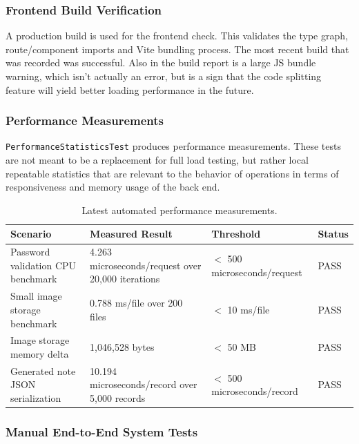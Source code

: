 \documentclass[a4paper, 12pt, titlepage]{article}
\begin{document}
\subsubsection{Frontend Build Verification}

A production build is used for the frontend check. This validates the type graph, route/component imports and Vite bundling process. The most recent build that was recorded was successful. Also in the build report is a large JS bundle warning, which isn't actually an error, but is a sign that the code splitting feature will yield better loading performance in the future.

\subsubsection{Performance Measurements}

\texttt{PerformanceStatisticsTest} produces performance measurements. These tests are not meant to be a replacement for full load testing, but rather local repeatable statistics that are relevant to the behavior of operations in terms of responsiveness and memory usage of the back end.

\begin{table}[H]
    \centering
    \begin{tabular}{|p{}|p{}|p{}|p{}|}
        \hline
        \textbf{Scenario} & \textbf{Measured Result} & \textbf{Threshold} & \textbf{Status} \\
        \hline
        Password validation CPU benchmark & 4.263 microseconds/request over 20,000 iterations & $<$ 500 microseconds/request & PASS \\
        \hline
        Small image storage benchmark & 0.788 ms/file over 200 files & $<$ 10 ms/file & PASS \\
        \hline
        Image storage memory delta & 1,046,528 bytes & $<$ 50 MB & PASS \\
        \hline
        Generated note JSON serialization & 10.194 microseconds/record over 5,000 records & $<$ 500 microseconds/record & PASS \\
        \hline
    \end{tabular}
    \caption{Latest automated performance measurements.}
    \label{tab:tabee_performance_measurements}
\end{table}

\subsubsection{Manual End-to-End System Tests}
\end{document}
